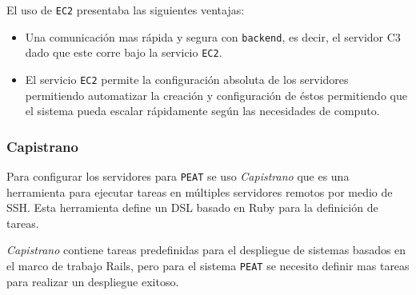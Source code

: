 El uso de \texttt{EC2} presentaba las siguientes ventajas:
\begin{itemize}
\item Una comunicación mas rápida y segura con \texttt{backend}, es decir, el
  servidor C3 dado que este corre bajo la servicio \texttt{EC2}.
\item El servicio \texttt{EC2} permite la configuración absoluta de los servidores
  permitiendo automatizar la creación y configuración de éstos permitiendo
  que el sistema pueda escalar rápidamente según las necesidades de computo.
\end{itemize}

\subsubsection{Capistrano}

Para configurar los servidores para \texttt{PEAT} se uso \textit{Capistrano} que
es una herramienta para ejecutar tareas en múltiples servidores remotos por medio
de SSH. Esta herramienta define un DSL basado en Ruby para la definición de tareas.

\textit{Capistrano} contiene tareas predefinidas para el despliegue de sistemas
basados en el marco de trabajo Rails, pero para el sistema \texttt{PEAT} se
necesito definir mas tareas para realizar un despliegue exitoso.
